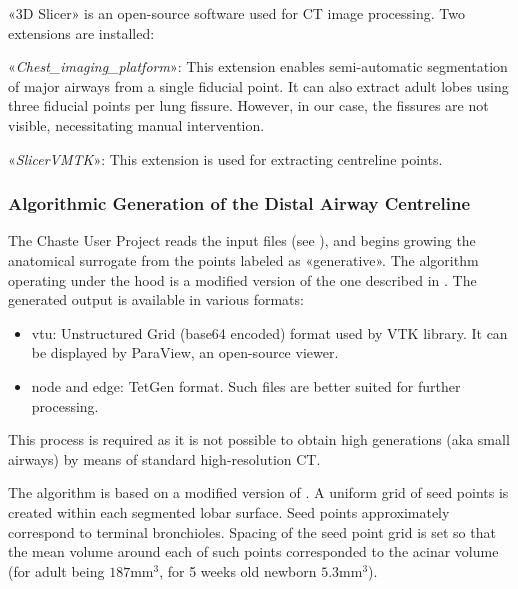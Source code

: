 «3D Slicer» is an open-source software used for CT image processing.
Two extensions are installed:

\begin{description}
\item «\emph{Chest\_imaging\_platform}»: This extension enables
  semi-automatic segmentation of major airways from a single fiducial
  point.  It can also extract adult lobes using three fiducial points
  per lung fissure. However, in our case, the fissures are not
  visible, necessitating manual intervention.
\item «\emph{SlicerVMTK}»: This extension is used for extracting
  centreline points.
\end{description}

\subsubsection{Algorithmic Generation of the Distal Airway Centreline}
\label{subsubsec:statistical_generation}

The Chaste User Project reads the input files
(see ), and begins growing the
anatomical surrogate from the points labeled as «generative».  The
algorithm operating under the hood is a modified version of the one
described in \cite{tawhai2000,bordas2015}.  The generated output is
available in various formats:

\begin{itemize}
\item vtu: Unstructured Grid (base64 encoded) format used by VTK
  library.  It can be displayed by ParaView, an open-source viewer.
\item node and edge: TetGen format.  Such files are better suited for
  further processing.
\end{itemize}


This process is required as it is not possible to obtain high
generations (aka small airways) by means of standard high-resolution
CT\cite{bordas2015}.

The algorithm is based on a modified version of \textcite{tawhai2000}.
A uniform grid of seed points is created within each segmented lobar
surface. Seed points approximately correspond to terminal bronchioles.
Spacing of the seed point grid is set so that the mean volume around
each of such points corresponded to the acinar volume (for adult being
$187\text{mm}^3$, for 5 weeks old newborn $5.3\text{mm}^3$).

